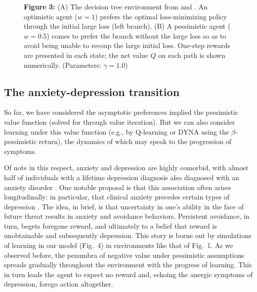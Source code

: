 \documentclass[11pt]{article} %
\begin{document}

\begin{figure}[!b]
  \centerline{%
  }
  \par \textbf{Figure 3:} (A) The decision tree environment from \cite{Huys2012} and \cite{Lally2017}. An optimistic agent ($w=1$) prefers the optimal loss-minimizing policy through the initial large loss (left branch). (B) A pessimistic agent ($w=0.5$) comes to prefer the branch without the large loss so as to avoid being unable to recoup the large initial loss. One-step rewards are presented in each state; the net value $Q$ on each path is shown numerically. (Parameters: $\gamma = 1.0$)
\end{figure}

\subsection{The anxiety-depression transition}

So far, we have considered the asymptotic preferences implied the pessimistic value function (solved for through value iteration). But we can also consider learning under this value function (e.g., by Q-learning\citep{SuttonBarto2018} or DYNA\citep{sutton1991} using the $\beta$-pessimistic return), the dynamics of which may speak to the progression of symptoms.

Of note in this respect, anxiety and depression are highly comorbid, with almost half of individuals with a lifetime depression diagnosis also diagnosed with an anxiety disorder \citep{kessler2015}. One notable proposal is that this association often arises longitudinally: in particular, that clinical anxiety precedes certain types of depression \citep{alloy1990, jacobson2014}. The idea, in brief, is that uncertainty in one's ability in the face of future threat results in anxiety and avoidance behaviors. Persistent avoidance, in turn, begets foregone reward, and ultimately to a belief that reward is unobtainable and subsequently depression. This story is borne out by simulations of learning in our model (Fig.~4) in environments like that of Fig.~1. As we observed before, the penumbra of negative value under pessimistic assumptions spreads gradually throughout the environment with the progress of learning. This in turn leads the agent to expect no reward and, echoing the anergic symptoms of depression, forego action altogether.
\end{document}
